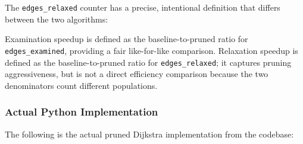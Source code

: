 The \texttt{edges\_relaxed} counter has a precise, intentional definition that differs between the two algorithms:

\begin{table}[htbp]
\centering
\renewcommand{\arraystretch}{1.3}
\caption[Edge-counting semantics]{Edge-counting semantics for baseline and pruned Dijkstra.}
\label{table:edges_relaxed}
\end{table}

Examination speedup is defined as the baseline-to-pruned ratio for \texttt{edges\_examined}, providing a fair like-for-like comparison.
Relaxation speedup is defined as the baseline-to-pruned ratio for \texttt{edges\_relaxed}; it captures pruning aggressiveness, but is not a direct efficiency comparison because the two denominators count different populations.

\subsubsection{Actual Python Implementation}

The following is the actual pruned Dijkstra implementation from the codebase:

